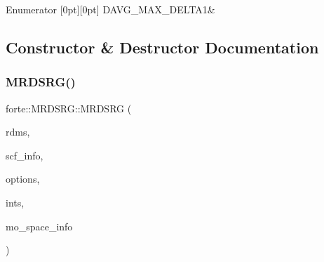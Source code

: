 \begin{DoxyEnumFields}{Enumerator}
[0pt][0pt]{}\mbox{\label{classforte_1_1_m_r_d_s_r_g_ae11de126949a51f3c7f7978e3802cf1aa2c412ab776614964ecaef4b1aaa8f71f}} 
D\+A\+V\+G\+\_\+\+M\+A\+X\+\_\+\+D\+E\+L\+T\+A1&\\
\hline

\end{DoxyEnumFields}


\subsection{Constructor \& Destructor Documentation}
\mbox{\label{classforte_1_1_m_r_d_s_r_g_af2d113511db2a13aa5ba38b6a20bf114}} 
\subsubsection{\texorpdfstring{M\+R\+D\+S\+R\+G()}{MRDSRG()}}
{\footnotesize\ttfamily forte\+::\+M\+R\+D\+S\+R\+G\+::\+M\+R\+D\+S\+RG (\begin{DoxyParamCaption}\item[{\mbox{\hyperlink{classforte_1_1_r_d_ms}{R\+D\+Ms}}}]{rdms,  }\item[{std\+::shared\+\_\+ptr$<$ \mbox{\hyperlink{classforte_1_1_s_c_f_info}{S\+C\+F\+Info}} $>$}]{scf\+\_\+info,  }\item[{std\+::shared\+\_\+ptr$<$ \mbox{\hyperlink{classforte_1_1_forte_options}{Forte\+Options}} $>$}]{options,  }\item[{std\+::shared\+\_\+ptr$<$ \mbox{\hyperlink{classforte_1_1_forte_integrals}{Forte\+Integrals}} $>$}]{ints,  }\item[{std\+::shared\+\_\+ptr$<$ \mbox{\hyperlink{classforte_1_1_m_o_space_info}{M\+O\+Space\+Info}} $>$}]{mo\+\_\+space\+\_\+info }\end{DoxyParamCaption})}

